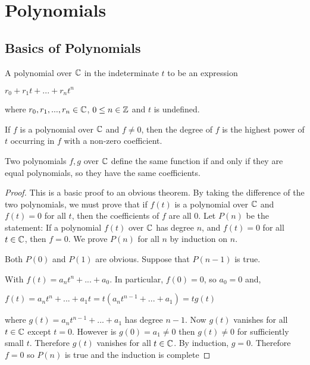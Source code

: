
\section{Polynomials}
\subsection{Basics of Polynomials}

\begin{definition}
    A polynomial over $\mathbb C$ in the indeterminate $t$ to be an expression 

    $r_0 + r_1 t +...+ r_n t^n$

    where $r_0,r_1,...,r_n \in \mathbb C$, $0 \le n \in \mathbb Z$ and $t$ is undefined.
\end{definition}

\begin{definition}
    If $f$ is a polynomial over $\mathbb C$ and $f \neq 0$, then the degree of $f$ is the highest power of $t$ occurring in $f$ with a non-zero coefficient.
\end{definition}

\begin{theorem}
    Two polynomials $f,g$ over $\mathbb C$ define the same function if and only if they are equal polynomials, so they have the same coefficients.
\end{theorem}

\begin{proof}
    This is a basic proof to an obvious theorem. By taking the difference of the two polynomials, we must prove that if $f(t)$ is a polynomial over $\mathbb C$ and $f(t) = 0$ for all $t$, then the coefficients of $f$ are all 0. Let $P(n)$ be the statement: If a polynomial $f(t)$ over $\mathbb C$ has degree $n$, and $f(t) = 0$ for all $t \in \mathbb C$, then $f=0$. We prove $P(n)$ for all $n$ by induction on $n$. 
    
    Both $P(0)$ and $P(1)$ are obvious. Suppose that $P(n-1)$ is true. 

    With $f(t) = a_n t^n +...+ a_0$. In particular, $f(0) = 0$, so $a_0 = 0$ and,

    $f(t) = a_n t^n +...+ a_1 t= t(a_n t^{n-1} +...+ a_1) = tg(t)$

    where $g(t) = a_n t^{n-1} +...+ a_1$ has degree $n-1$. Now $g(t)$ vanishes for all $t \in \mathbb C$ except $t=0$. However is $g(0) = a_1 \neq 0$ then $g(t) \neq 0$ for sufficiently small $t$. Therefore $g(t)$ vanishes for all $t \in \mathbb C$. By induction, $g=0$. Therefore $f=0$ so $P(n)$ is true and the induction is complete
\end{proof}

